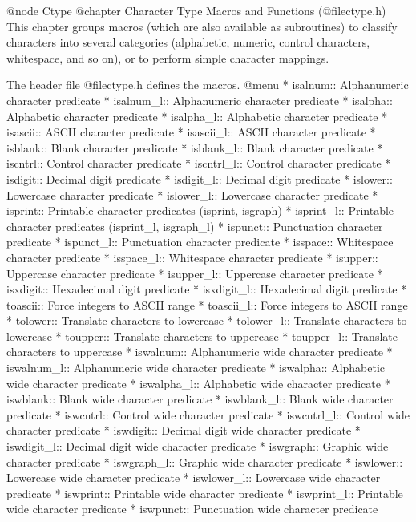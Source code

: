 @node Ctype
@chapter Character Type Macros and Functions (@file{ctype.h})
This chapter groups macros (which are also available as subroutines)
to classify characters into several categories (alphabetic,
numeric, control characters, whitespace, and so on), or to perform
simple character mappings.

The header file @file{ctype.h} defines the macros.
@menu 
* isalnum::   Alphanumeric character predicate
* isalnum_l:: Alphanumeric character predicate
* isalpha::   Alphabetic character predicate
* isalpha_l:: Alphabetic character predicate
* isascii::   ASCII character predicate
* isascii_l:: ASCII character predicate
* isblank::   Blank character predicate
* isblank_l:: Blank character predicate
* iscntrl::   Control character predicate
* iscntrl_l:: Control character predicate
* isdigit::   Decimal digit predicate
* isdigit_l:: Decimal digit predicate
* islower::   Lowercase character predicate
* islower_l:: Lowercase character predicate
* isprint::   Printable character predicates (isprint, isgraph)
* isprint_l:: Printable character predicates (isprint_l, isgraph_l)
* ispunct::   Punctuation character predicate
* ispunct_l::   Punctuation character predicate
* isspace::   Whitespace character predicate
* isspace_l::   Whitespace character predicate
* isupper::   Uppercase character predicate
* isupper_l::   Uppercase character predicate
* isxdigit::  Hexadecimal digit predicate
* isxdigit_l::  Hexadecimal digit predicate
* toascii::   Force integers to ASCII range
* toascii_l::   Force integers to ASCII range
* tolower::   Translate characters to lowercase
* tolower_l::   Translate characters to lowercase
* toupper::   Translate characters to uppercase
* toupper_l::   Translate characters to uppercase
* iswalnum::  Alphanumeric wide character predicate
* iswalnum_l::  Alphanumeric wide character predicate
* iswalpha::  Alphabetic wide character predicate
* iswalpha_l::  Alphabetic wide character predicate
* iswblank::  Blank wide character predicate
* iswblank_l::  Blank wide character predicate
* iswcntrl::  Control wide character predicate
* iswcntrl_l::  Control wide character predicate
* iswdigit::  Decimal digit wide character predicate
* iswdigit_l::  Decimal digit wide character predicate
* iswgraph::  Graphic wide character predicate
* iswgraph_l::  Graphic wide character predicate
* iswlower::  Lowercase wide character predicate
* iswlower_l::  Lowercase wide character predicate
* iswprint::  Printable wide character predicate
* iswprint_l::  Printable wide character predicate
* iswpunct::  Punctuation wide character predicate

